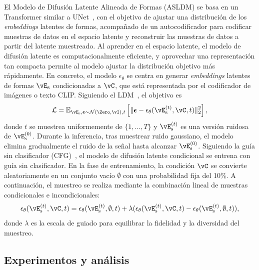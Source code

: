 \documentclass[../../book-main_es.tex]{subfiles}
\begin{document}
El Modelo de Difusión Latente Alineada de Formas (ASLDM) se basa en un
Transformer similar a UNet~\cite{10203178}, con el objetivo de ajustar una distribución
de los \textit{embeddings} latentes de formas, acompañado de un autocodificador para
codificar muestras de datos en el espacio latente y reconstruir las
muestras de datos a partir del latente muestreado. Al aprender en el espacio latente,
el modelo de difusión latente es computacionalmente eficiente, y
aprovechar una representación tan compacta permite al modelo ajustar la
distribución objetivo más rápidamente. En concreto, el modelo
$\epsilon_{\theta}$ se centra en generar \textit{embeddings} latentes de formas
$\vE_{\mathrm{s}}$ condicionadas a $\vC$, que está representada por el
codificador de imágenes o texto CLIP. Siguiendo el LDM~\cite{rombach2022high}, el
objetivo es
\begin{equation}
\mathcal{L} = \mathbb{E}_{\vE_{\mathrm{s}}, \boldsymbol{\epsilon} \sim
\mathcal{N}(\Zero,\vI),t} \left[ \Vert \boldsymbol{\epsilon}
- \epsilon_\theta(\vE_{\mathrm{s}}^{(t)}, \vC, t) \Vert^2_2 \right],
\end{equation}
donde $t$ se muestrea uniformemente de $\{1, ..., T\}$ y
$\vE_{\mathrm{s}}^{(t)}$ es una versión ruidosa de
$\vE_{\mathrm{s}}^{(0)}$. Durante la inferencia, tras muestrear ruido gaussiano,
el modelo elimina gradualmente el ruido de la señal hasta alcanzar
$\vE_{\mathrm{s}}^{(0)}$. Siguiendo la guía sin clasificador
(CFG)~\cite{ho2021classifierfree}, el modelo de difusión latente condicional
se entrena con guía sin clasificador. En la fase de entrenamiento,
la condición $\vC$ se convierte aleatoriamente en un conjunto vacío
$\emptyset$ con una probabilidad fija del 10\%. A continuación, el muestreo se
realiza mediante la combinación lineal de muestras condicionales e incondicionales:
\begin{equation}
\epsilon_\theta ( \vE_{\mathrm{s}}^{(t)}, \vC, t ) = \epsilon_\theta(
\vE_{\mathrm{s}}^{(t)}, \emptyset, t ) + \lambda
( \epsilon_\theta( \vE_{\mathrm{s}}^{(t)}, \vC, t ) -\epsilon_\theta(
\vE_{\mathrm{s}}^{(t)}, \emptyset, t ) ),
\label{eq:cfg-michelangelo}
\end{equation}
donde $\lambda$ es la escala de guiado para equilibrar la
fidelidad y la diversidad del muestreo.

\subsection{Experimentos y análisis}
\end{document}
